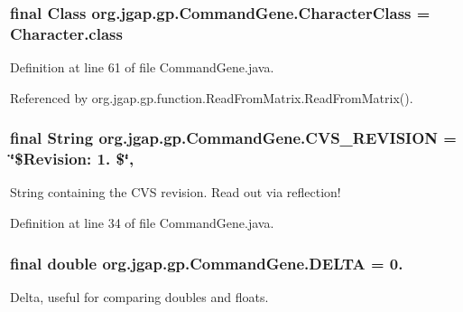 \hypertarget{classorg_1_1jgap_1_1gp_1_1_command_gene_abf05098901c0eb523e5f2bd9ee2879b4}{
\subsubsection[{Character\-Class}]{\setlength{\rightskip}{0pt plus 5cm}final Class org.\-jgap.\-gp.\-Command\-Gene.\-Character\-Class = Character.\-class\hspace{0.3cm}{\ttfamily [static]}}}\label{classorg_1_1jgap_1_1gp_1_1_command_gene_abf05098901c0eb523e5f2bd9ee2879b4}


Definition at line 61 of file Command\-Gene.\-java.



Referenced by org.\-jgap.\-gp.\-function.\-Read\-From\-Matrix.\-Read\-From\-Matrix().

\hypertarget{classorg_1_1jgap_1_1gp_1_1_command_gene_aff4fea0f4d150814aa1659c457d0401c}{
\subsubsection[{C\-V\-S\-\_\-\-R\-E\-V\-I\-S\-I\-O\-N}]{\setlength{\rightskip}{0pt plus 5cm}final String org.\-jgap.\-gp.\-Command\-Gene.\-C\-V\-S\-\_\-\-R\-E\-V\-I\-S\-I\-O\-N = \char`\"{}\$Revision\-: 1. \$\char`\"{}\hspace{0.3cm}{\ttfamily [static]}, {\ttfamily [private]}}}\label{classorg_1_1jgap_1_1gp_1_1_command_gene_aff4fea0f4d150814aa1659c457d0401c}
String containing the C\-V\-S revision. Read out via reflection! 

Definition at line 34 of file Command\-Gene.\-java.

\hypertarget{classorg_1_1jgap_1_1gp_1_1_command_gene_aaae25157e6e9d3c86ce546a00673629e}{
\subsubsection[{D\-E\-L\-T\-A}]{\setlength{\rightskip}{0pt plus 5cm}final double org.\-jgap.\-gp.\-Command\-Gene.\-D\-E\-L\-T\-A = 0.\hspace{0.3cm}{\ttfamily [static]}}}\label{classorg_1_1jgap_1_1gp_1_1_command_gene_aaae25157e6e9d3c86ce546a00673629e}
Delta, useful for comparing doubles and floats. 

